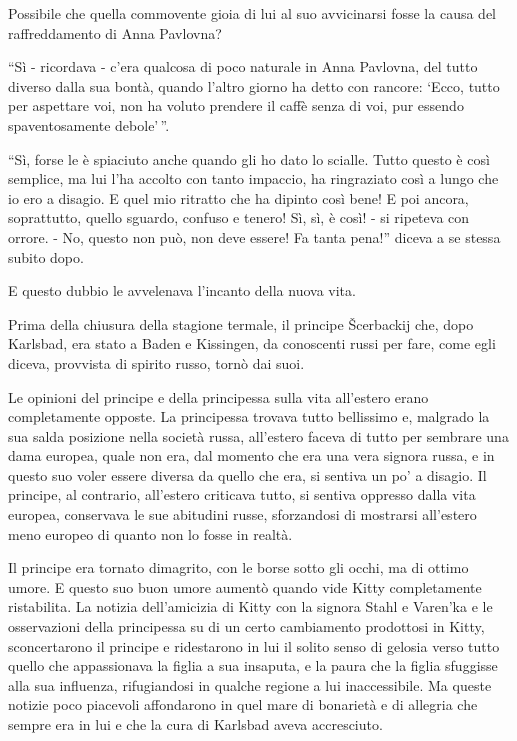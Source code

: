 Possibile che quella commovente gioia di lui al suo avvicinarsi fosse la causa del raffreddamento di Anna Pavlovna? 

``Sì - ricordava - c'era qualcosa di poco naturale in Anna Pavlovna, del tutto diverso dalla sua bontà, quando l'altro giorno ha detto con rancore: `Ecco, tutto per aspettare voi, non ha voluto prendere il caffè senza di voi, pur essendo spaventosamente debole'\,''. 

``Sì, forse le è spiaciuto anche quando gli ho dato lo scialle. Tutto questo è così semplice, ma lui l'ha accolto con tanto impaccio, ha ringraziato così a lungo che io ero a disagio. E quel mio ritratto che ha dipinto così bene! E poi ancora, soprattutto, quello sguardo, confuso e tenero! Sì, sì, è così! - si ripeteva con orrore. - No, questo non può, non deve essere! Fa tanta pena!'' diceva a se stessa subito dopo. 

E questo dubbio le avvelenava l'incanto della nuova vita. 

\label{xxxiv-1} 

Prima della chiusura della stagione termale, il principe Šcerbackij che, dopo Karlsbad, era stato a Baden e Kissingen, da conoscenti russi per fare, come egli diceva, provvista di spirito russo, tornò dai suoi. 

Le opinioni del principe e della principessa sulla vita all'estero erano completamente opposte. La principessa trovava tutto bellissimo e, malgrado la sua salda posizione nella società russa, all'estero faceva di tutto per sembrare una dama europea, quale non era, dal momento che era una vera signora russa, e in questo suo voler essere diversa da quello che era, si sentiva un po' a disagio. Il principe, al contrario, all'estero criticava tutto, si sentiva oppresso dalla vita europea, conservava le sue abitudini russe, sforzandosi di mostrarsi all'estero meno europeo di quanto non lo fosse in realtà. 

Il principe era tornato dimagrito, con le borse sotto gli occhi, ma di ottimo umore. E questo suo buon umore aumentò quando vide Kitty completamente ristabilita. La notizia dell'amicizia di Kitty con la signora Stahl e Varen'ka e le osservazioni della principessa su di un certo cambiamento prodottosi in Kitty, sconcertarono il principe e ridestarono in lui il solito senso di gelosia verso tutto quello che appassionava la figlia a sua insaputa, e la paura che la figlia sfuggisse alla sua influenza, rifugiandosi in qualche regione a lui inaccessibile. Ma queste notizie poco piacevoli affondarono in quel mare di bonarietà e di allegria che sempre era in lui e che la cura di Karlsbad aveva accresciuto. 

